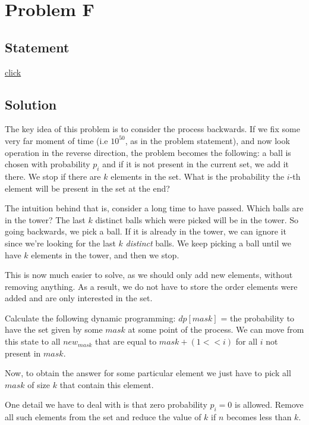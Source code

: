 \section{Problem F}
\subsection{Statement}
\href{http://foobar.iiitd.edu.in/contest/team/problem.php?id=532}{click}

\subsection{Solution}
The key idea of this problem is to consider the process backwards. If we fix some very far moment of time (i.e $10^{50}$, as in the 
problem statement), and now look operation in the reverse direction, the problem becomes the following: a ball is chosen with probability
$p_i$ and if it is not present in the current set, we add it there. We stop if there are $k$ elements in the set. What is the probability
the $i$-th element will be present in the set at the end? 

The intuition behind that is, consider a long time to have passed. Which balls are in the tower? The last $k$ distinct balls
which were picked will be in the tower. So going backwards, we pick a ball. If it is already in the tower, we can ignore it since
we're looking for the last $k$ \emph{distinct} balls. We keep picking a ball until we have $k$ elements in the tower, and then we stop.

This is now much easier to solve, as we should only add new elements, without removing anything. As a result, we do not have to store the
order elements were added and are only interested in the set. 

Calculate the following dynamic programming: $dp[mask]$ = the probability to have the set given by some $mask$ at some point of the 
process. We can move from this state to all $new_{mask}$ that are equal to $mask + (1 << i)$ for all $i$ not present in $mask$.

Now, to obtain the answer for some particular element we just have to pick all $mask$ of size $k$ that contain this element.

One detail we have to deal with is that zero probability $p_i = 0$ is allowed. Remove all such elements from the set and reduce the value
of $k$ if $n$ becomes less than $k$.
